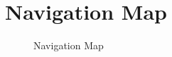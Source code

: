 \section{Navigation Map}
\begin{figure}[H]\centering
    \setlength{\fboxrule}{0.2mm} %
    \setlength{\fboxsep}{0.5cm}
    \caption{Navigation Map}\label{fig:navMap}
\end{figure}
\newpage
